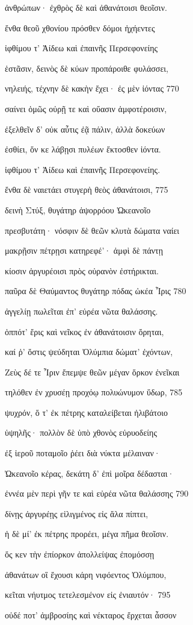 ἀνθρώπων· ἐχθρὸς δὲ καὶ ἀθανάτοισι θεοῖσιν. 

ἔνθα θεοῦ χθονίου πρόσθεν δόμοι ἠχήεντες

ἰφθίμου τ' Ἀίδεω καὶ ἐπαινῆς Περσεφονείης

ἑστᾶσιν, δεινὸς δὲ κύων προπάροιθε φυλάσσει, 

νηλειής, τέχνην δὲ κακὴν ἔχει· ἐς μὲν ἰόντας 770 

σαίνει ὁμῶς οὐρῇ τε καὶ οὔασιν ἀμφοτέροισιν,

ἐξελθεῖν δ' οὐκ αὖτις ἐᾷ πάλιν, ἀλλὰ δοκεύων

ἐσθίει, ὅν κε λάβῃσι πυλέων ἔκτοσθεν ἰόντα.

ἰφθίμου τ' Ἀίδεω καὶ ἐπαινῆς Περσεφονείης.

ἔνθα δὲ ναιετάει στυγερὴ θεὸς ἀθανάτοισι, 775

δεινὴ Στύξ, θυγάτηρ ἀψορρόου Ὠκεανοῖο

πρεσβυτάτη· νόσφιν δὲ θεῶν κλυτὰ δώματα ναίει 

μακρῇσιν πέτρῃσι κατηρεφέ'· ἀμφὶ δὲ πάντῃ 

κίοσιν ἀργυρέοισι πρὸς οὐρανὸν ἐστήρικται.

παῦρα δὲ Θαύμαντος θυγάτηρ πόδας ὠκέα Ἶρις 780

ἀγγελίῃ πωλεῖται ἐπ' εὐρέα νῶτα θαλάσσης. 

ὁππότ' ἔρις καὶ νεῖκος ἐν ἀθανάτοισιν ὄρηται, 

καί ῥ' ὅστις ψεύδηται Ὀλύμπια δώματ' ἐχόντων,

Ζεὺς δέ τε Ἶριν ἔπεμψε θεῶν μέγαν ὅρκον ἐνεῖκαι

τηλόθεν ἐν χρυσέῃ προχόῳ πολυώνυμον ὕδωρ, 785 

ψυχρόν, ὅ τ' ἐκ πέτρης καταλείβεται ἠλιβάτοιο 

ὑψηλῆς· πολλὸν δὲ ὑπὸ χθονὸς εὐρυοδείης 

ἐξ ἱεροῦ ποταμοῖο ῥέει διὰ νύκτα μέλαιναν· 

Ὠκεανοῖο κέρας, δεκάτη δ' ἐπὶ μοῖρα δέδασται· 

ἐννέα μὲν περὶ γῆν τε καὶ εὐρέα νῶτα θαλάσσης 790

δίνῃς ἀργυρέῃς εἱλιγμένος εἰς ἅλα πίπτει,

ἡ δὲ μί' ἐκ πέτρης προρέει, μέγα πῆμα θεοῖσιν. 

ὅς κεν τὴν ἐπίορκον ἀπολλείψας ἐπομόσσῃ

ἀθανάτων οἳ ἔχουσι κάρη νιφόεντος Ὀλύμπου,

κεῖται νήυτμος τετελεσμένον εἰς ἐνιαυτόν· 795 

οὐδέ ποτ' ἀμβροσίης καὶ νέκταρος ἔρχεται ἆσσον

